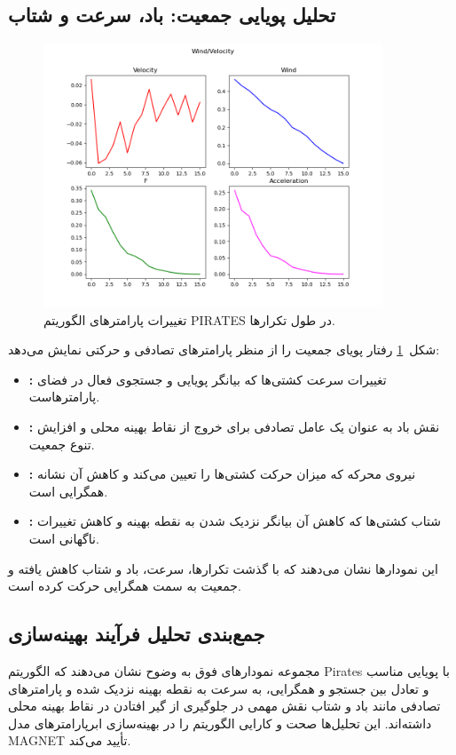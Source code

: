 \subsection{تحلیل پویایی جمعیت: باد، سرعت و شتاب}
\begin{figure}[h!]
    \centering
    \includegraphics[width=0.9\textwidth]{images/pirates_wind_velocity.png}
    \caption{تغییرات پارامترهای الگوریتم PIRATES در طول تکرارها.}
    \label{fig:pirates_wind_velocity}
\end{figure}

شکل~\ref{fig:pirates_wind_velocity} رفتار پویای جمعیت را از منظر پارامترهای تصادفی و حرکتی نمایش می‌دهد:
\begin{itemize}
    \item \textbf{:} تغییرات سرعت کشتی‌ها که بیانگر پویایی و جستجوی فعال در فضای پارامترهاست.
    \item \textbf{:} نقش باد به عنوان یک عامل تصادفی برای خروج از نقاط بهینه محلی و افزایش تنوع جمعیت.
    \item \textbf{:} نیروی محرکه که میزان حرکت کشتی‌ها را تعیین می‌کند و کاهش آن نشانه همگرایی است.
    \item \textbf{:} شتاب کشتی‌ها که کاهش آن بیانگر نزدیک شدن به نقطه بهینه و کاهش تغییرات ناگهانی است.
\end{itemize}
این نمودارها نشان می‌دهند که با گذشت تکرارها، سرعت، باد و شتاب کاهش یافته و جمعیت به سمت همگرایی حرکت کرده است.

\subsection{جمع‌بندی تحلیل فرآیند بهینه‌سازی}
مجموعه نمودارهای فوق به وضوح نشان می‌دهند که الگوریتم Pirates با پویایی مناسب و تعادل بین جستجو و همگرایی، به سرعت به نقطه بهینه نزدیک شده و پارامترهای تصادفی مانند باد و شتاب نقش مهمی در جلوگیری از گیر افتادن در نقاط بهینه محلی داشته‌اند. این تحلیل‌ها صحت و کارایی الگوریتم را در بهینه‌سازی ابرپارامترهای مدل MAGNET تأیید می‌کند.


